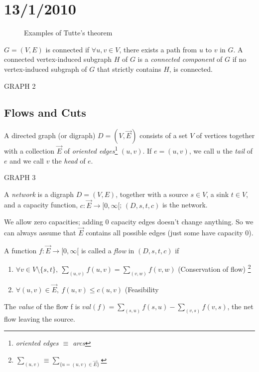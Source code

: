 \documentclass{article}
\begin{document}
\section*{13/1/2010}


\begin{figure}[H]
\centering
\subfloat[No perfect Matching (take $S=\emptyset$)]{} \quad \qquad 
\subfloat[take $S=\{v\}$]{}\quad \qquad 
\subfloat[$S=\{u,v\}$]{\scalebox{.8}{}}
\caption{Examples of Tutte's theorem}
\end{figure}


\begin{defn}
$G=(V,E)$ is connected if $\forall u,v \in V$, there exists a path from $u$ to $v$ in $G$. A connected vertex-induced subgraph $H$ of $G$ is a \emph{connected component} of $G$ if no vertex-induced subgraph of $G$ that strictly contains $H$, is connected.
\end{defn}

GRAPH 2

\subsection*{Flows and Cuts}

A directed graph (or digraph) $D=(V,\overrightarrow{E})$ consists of a set $V$ of vertices together with a collection $\overrightarrow{E}$ of \emph{oriented edges}\footnote{\emph{oriented edges $\equiv$ arcs}} $(u,v)$. If $e=(u,v)$, we call $u$ the \emph{tail} of $e$ and we call $v$ the \emph{head} of $e$.  

GRAPH 3

\begin{defn}
A \emph{network} is a digraph $D=(V,E)$, together with a source $s \in V$, a sink $t \in V$, and a capacity function, $c: \overrightarrow{E} \rightarrow [0,\infty[$; $(D,s,t,c)$ is the network.
\end{defn}

\begin{rem}
We allow zero capacities; adding 0 capacity edges doesn't change anything.  So we can always assume that $\overrightarrow{E}$ contains all possible edges (just some have capacity 0).
\end{rem}

\begin{defn}
A function $f: \overrightarrow{E} \rightarrow [0,\infty[$ is called a \emph{flow} in $(D,s,t,c)$ if
\begin{enumerate}
 \item $\forall v \in V \setminus \{s,t\},~ \displaystyle\sum_{(u,v)} f(u,v) = \sum_{(v,w)} f(v,w)$ (Conservation of flow) \footnote{$\displaystyle  \sum_{(u,v)} \equiv \sum_{\{u=(u,v) \in \overrightarrow{E} \}}$}
\item $\forall (u,v) \in \overrightarrow{E}, ~ f(u,v) \leq c(u,v)$ (Feasibility
\end{enumerate}
The \emph{value} of the flow f is $val(f)=\displaystyle\sum_{(s,u)} f(s,u) - \sum_{(v,s)}f(v,s)$, the net flow leaving the source.
\end{defn}
\end{document}
